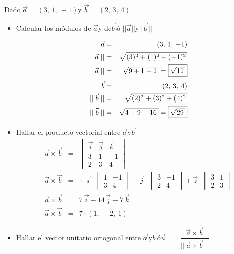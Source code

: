 Dado \quad$\overrightarrow{a\,} = (3,\,1,\,-1)$\quad y \quad$\overrightarrow{b\,} = (2,\,3,\,4)$
\begin{itemize}
\item{Calcular los módulos de $\overrightarrow{a\,}$\;\;y de\;\;$\overrightarrow{b\,}$\qquad ó \qquad$\lvert\mid\vec{a}\mid\rvert$\;\;y\;\;$\lvert\mid\vec{b}\mid\rvert$

\begin{eqnarray*}
\vec{a} &=& (3,\,1,\,-1) \\
\lvert\mid\vec{a}\mid\rvert &=& \sqrt{(3)^{2} + (1)^{2} + (-1)^{2} \,} \\
||\;{\vec{a}}\;|| &=& \sqrt{9 + 1 + 1\;} = \framebox{$\sqrt{11\,}$}
\end{eqnarray*}
\begin{eqnarray*}
\vec{b} &=& (2,\,3,\,4) \\
||\;{\vec{b}}\;|| &=& \sqrt{(2)^{2} + (3)^{2} + (4)^{2} \,} \\
||\;{\vec{b}}\;|| &=& \sqrt{4 + 9 + 16\;} = \framebox{$\sqrt{29\,}$}
\end{eqnarray*}
}
\item{Hallar el producto vectorial entre $\overrightarrow{a\,}$\;\;y\;\;$\overrightarrow{b\,}$
\begin{eqnarray*}
\vec{a} \times \vec{b} &=& \begin{vmatrix} \vec{i} & \vec{j} & \vec{k} \\ 3 & 1 & -1 \\ 2 & 3 & 4 \end{vmatrix} \\
\vec{a} \times \vec{b} &=& +\,\vec{i}\;\;\begin{vmatrix} 1 & -1 \\ 3 & 4 \end{vmatrix} - \vec{j}\;\;\begin{vmatrix} 3 & -1 \\ 2 & 4 \end{vmatrix} + \vec{z}\;\;\begin{vmatrix} 3 & 1 \\ 2 & 3 \end{vmatrix} \\
\vec{a} \times \vec{b} &=& 7\,\vec{i} - 14\,\vec{j} + 7\,\vec{k} \\
\vec{a} \times \vec{b} &=& 7 \cdot (1,\,-2,\,1)
\end{eqnarray*}
}
\item{Hallar el vector unitario ortogonal entre $\overrightarrow{a\,}$\;\;y\;\;$\overrightarrow{b\,}$\quad ó\quad$\vec{u}^{\,\perp} = \dfrac{\vec{a} \times \vec{b}}{||\,\vec{a} \times \vec{b}\,||}$
}
\end{itemize}
